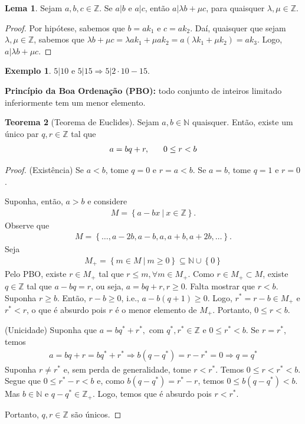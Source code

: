 \documentclass[a4paper,11pt,twoside, leqno]{article}
\theoremstyle{definition}
\newtheorem{theorem}{Teorema}[section]
\newtheorem{lemma}[theorem]{Lema}
\newtheorem*{example}{Exemplo}
\begin{document}
\begin{lemma}
	\label{lema 2}
	Sejam $a,b,c\in\mathbb{Z}$. Se $a|b$ e $a|c$, então $a|\lambda b + \mu c$, para quaisquer $\lambda, \mu\in\mathbb{Z}$.
\end{lemma}
\begin{proof}
	Por hipótese, sabemos que $b = ak_1$ e $c = ak_2$. Daí, quaisquer que sejam $\lambda,\mu\in\mathbb{Z}$, sabemos que $\lambda b + \mu c = \lambda ak_1 + \mu ak_2 = a(\lambda k_1 + \mu k_2) = ak_3$. Logo, $a|\lambda b + \mu c$.
\end{proof}
\begin{example}
	$5|10$ e $5|15 \Rightarrow 5|2\cdot 10 - 15$. 
\end{example}
\par\textbf{Princípio da Boa Ordenação (PBO):} todo conjunto de inteiros limitado inferiormente tem um menor elemento.
\begin{theorem}[Teorema de Euclides]
	\label{euclides}
	Sejam $a,b\in\mathbb{N}$ quaisquer. Então, existe um único par $q,r\in\mathbb{Z}$ tal que 
	\begin{align*}
	a = bq + r, \hspace{0.6cm} 0\leq r < b
	\end{align*}
\end{theorem}
\begin{proof}
	(Existência) Se $a<b$, tome $q = 0$ e $r = a<b$. Se $a = b$, tome $q = 1$ e $r = 0$.
	
	Suponha, então, $a > b$ e considere
	\begin{align*}
	M = \left\{ a - bx \ | \ x\in\mathbb{Z} \right\}.
	\end{align*}
	Observe que 
	\begin{align*}
	M = \left\{ \dots, a - 2b, a-b, a, a+b, a+2b, \dots \right\}.
	\end{align*}
	Seja 
	\begin{align*}
	M_+ = \left\{ m\in M \ | \ m\geq 0 \right\}\subseteq\mathbb{N}\cup\left\{0\right\}
	\end{align*}
	Pelo PBO, existe $r\in M_+$ tal que $r\leq m, \forall m\in M_+$. Como $r\in M_+\subset M$, existe $q\in\mathbb{Z}$ tal que $a - bq = r$, ou seja, $a = bq + r, r\geq 0$. Falta mostrar que $r < b$. Suponha $r\geq b$. Então, $r - b\geq 0$, i.e., $a - b(q+1) \geq 0$. Logo, $r^\ast = r-b\in M_+$ e $r^\ast < r$, o que é absurdo pois $r$ é o menor elemento de $M_+$. Portanto, $0\leq r < b$.
	
	(Unicidade) Suponha que $a = bq^\ast + r^\ast, \text{ com } q^\ast,r^\ast\in\mathbb{Z}$ e $0\leq r^\ast < b$. Se $r = r^\ast$, temos 
	\begin{align*}
	a = bq + r = bq^\ast + r^\ast \Rightarrow b(q - q^\ast) = r - r^\ast = 0 \Rightarrow q = q^\ast
	\end{align*}
	Suponha $r\neq r^\ast$ e, sem perda de generalidade, tome $r<r^\ast$. Temos $0\leq r < r^\ast < b$. Segue que $0\leq r^\ast - r < b$ e, como $b(q - q^\ast) = r^\ast - r$, temos $0\leq b(q - q^\ast) < b$. Mas $b\in\mathbb{N}$ e $q - q^\ast\in\mathbb{Z}_+$. Logo, temos que é absurdo pois $r < r^\ast$. 
	
	Portanto, $q,r\in\mathbb{Z}$ são únicos.
\end{proof}
\end{document}
